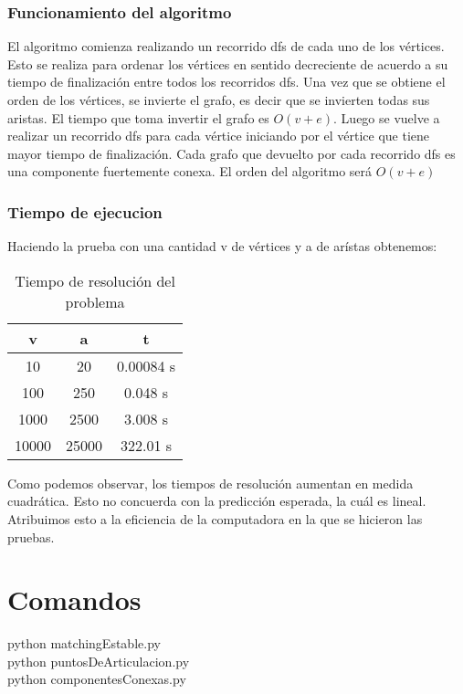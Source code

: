 \documentclass{article}
\begin{document}
            \subsubsection{Funcionamiento del algoritmo}
                El algoritmo comienza realizando un recorrido dfs de cada uno de los
                vértices. Esto se realiza para ordenar los vértices en sentido
                decreciente de acuerdo a su tiempo de finalización entre todos los
                recorridos dfs. Una vez que se obtiene el orden de los vértices,
                se invierte el grafo, es decir que se invierten todas sus aristas.
                El tiempo que toma invertir el grafo es $O(v+e)$. Luego se vuelve a
                realizar un recorrido dfs para cada vértice iniciando por el vértice
                que tiene mayor tiempo de finalización. Cada grafo que devuelto por cada
                recorrido dfs es una componente fuertemente conexa.
                El orden del algoritmo será $O(v+e)$

            \subsubsection{Tiempo de ejecucion}
              Haciendo la prueba con una cantidad v de vértices y a de arístas obtenemos:
                \begin{table}[h!]
                    \centering
                    \caption{Tiempo de resolución del problema}
                    \begin{tabular}{c|c|c}
                        v & a & t \\
                        \hline
                        10 & 20 & 0.00084 s \\
                        \hline
                        100 & 250 & 0.048 s \\
                        \hline
                        1000 & 2500 & 3.008 s \\
                        \hline
                        10000 & 25000 & 322.01 s
                    \end{tabular}
                \end{table}

                Como podemos observar, los tiempos de resolución aumentan en medida
                cuadrática. Esto no concuerda con la predicción esperada, la cuál es
                lineal. Atribuimos esto a la eficiencia de la computadora en la que
                se hicieron las pruebas.

    \section{Comandos}
      python matchingEstable.py \\
      python puntosDeArticulacion.py \\
      python componentesConexas.py
\end{document}
